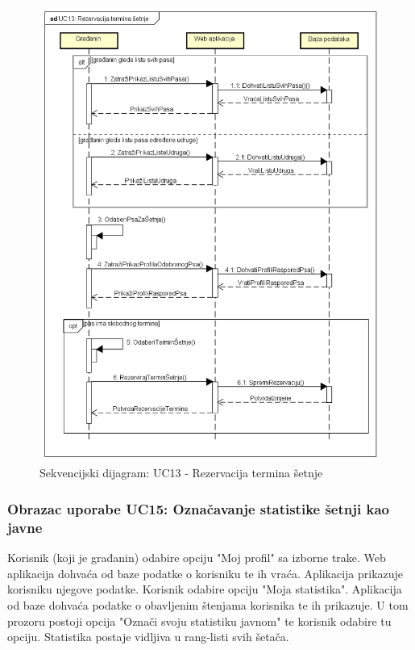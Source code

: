 			
			\begin{figure}[H]
				\includegraphics[scale=0.68]{dijagrami/UC13.png} %
				\caption{Sekvencijski dijagram: UC13 - Rezervacija termina šetnje}
			\label{fig:UC13} %
			\end{figure}
	
			\subsubsection{Obrazac uporabe UC15: Označavanje statistike šetnji kao javne}
			
			Korisnik (koji je građanin) odabire opciju "Moj profil" sa izborne trake. Web aplikacija dohvaća od baze podatke o korisniku te ih vraća. Aplikacija prikazuje korisniku njegove podatke. Korisnik odabire opciju "Moja statistika". Aplikacija od baze dohvaća podatke o obavljenim štenjama korisnika te ih prikazuje. U tom prozoru postoji opcija "Označi svoju statistiku javnom" te korisnik odabire tu opciju. Statistika postaje vidljiva u rang-listi svih šetača.
	
